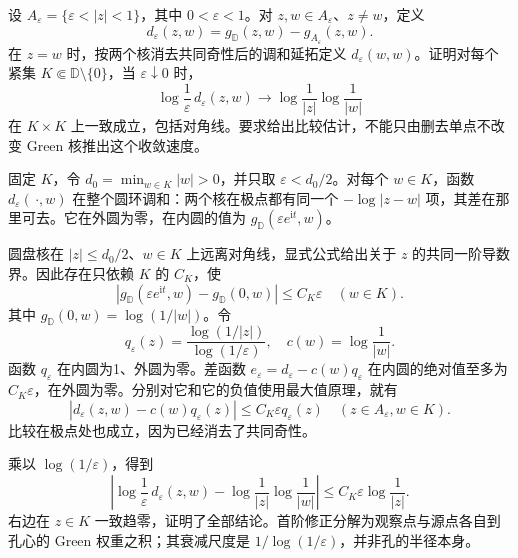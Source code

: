 \begin{exercise}\label{b3:ex:17-draft-04}
设 \(A_\varepsilon=\{\varepsilon<|z|<1\}\)，其中 \(0<\varepsilon<1\)。对 \(z,w\in A_\varepsilon\)、\(z\ne w\)，定义
\[
 d_\varepsilon(z,w)
 =g_{\mathbb D}(z,w)-g_{A_\varepsilon}(z,w).
\]
在 \(z=w\) 时，按两个核消去共同奇性后的调和延拓定义 \(d_\varepsilon(w,w)\)。证明对每个紧集 \(K\Subset\mathbb D\setminus\{0\}\)，当 \(\varepsilon\downarrow0\) 时，
\[
 \log\frac1\varepsilon\,d_\varepsilon(z,w)
 \longrightarrow\log\frac1{|z|}\log\frac1{|w|}
\]
在 \(K\times K\) 上一致成立，包括对角线。要求给出比较估计，不能只由删去单点不改变 Green 核推出这个收敛速度。
\end{exercise}
\begin{solution}
固定 \(K\)，令 \(d_0=\min_{w\in K}|w|>0\)，并只取 \(\varepsilon<d_0/2\)。对每个 \(w\in K\)，函数 \(d_\varepsilon(\,\cdot,w)\) 在整个圆环调和：两个核在极点都有同一个 \(-\log|z-w|\) 项，其差在那里可去。它在外圆为零，在内圆的值为 \(g_{\mathbb D}(\varepsilon e^{\mathrm it},w)\)。

圆盘核在 \(|z|\le d_0/2\)、\(w\in K\) 上远离对角线，显式公式给出关于 \(z\) 的共同一阶导数界。因此存在只依赖 \(K\) 的 \(C_K\)，使
\[
 \left|g_{\mathbb D}(\varepsilon e^{\mathrm it},w)
        -g_{\mathbb D}(0,w)\right|\le C_K\varepsilon
 \quad(w\in K).
\]
其中 \(g_{\mathbb D}(0,w)=\log(1/|w|)\)。令
\[
 q_\varepsilon(z)=\frac{\log(1/|z|)}{\log(1/\varepsilon)},
 \quad c(w)=\log\frac1{|w|}.
\]
函数 \(q_\varepsilon\) 在内圆为1、外圆为零。差函数
\(e_\varepsilon=d_\varepsilon-c(w)q_\varepsilon\) 在内圆的绝对值至多为 \(C_K\varepsilon\)，在外圆为零。分别对它和它的负值使用最大值原理，就有
\[
 \left|d_\varepsilon(z,w)-c(w)q_\varepsilon(z)\right|
 \le C_K\varepsilon q_\varepsilon(z)
 \quad(z\in A_\varepsilon,w\in K).
\]
比较在极点处也成立，因为已经消去了共同奇性。

乘以 \(\log(1/\varepsilon)\)，得到
\[
 \left|\log\frac1\varepsilon\,d_\varepsilon(z,w)
       -\log\frac1{|z|}\log\frac1{|w|}\right|
 \le C_K\varepsilon\log\frac1{|z|}.
\]
右边在 \(z\in K\) 一致趋零，证明了全部结论。首阶修正分解为观察点与源点各自到孔心的 Green 权重之积；其衰减尺度是 \(1/\log(1/\varepsilon)\)，并非孔的半径本身。
\end{solution}

